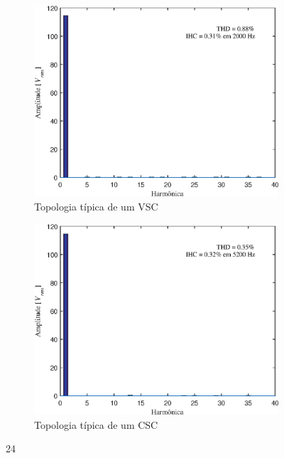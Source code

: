 \begin{figure}[!htb] %
	\centering
	\begin{subfigure}[b]{0.48\textwidth}
		\centering
		\includegraphics[width=\textwidth]{Cap4/Figuras/resultados_unfilt_24.eps}
		\caption{Topologia típica de um VSC} 
		\label{fig:resultados_unfilt_24.eps}
	\end{subfigure}%
		\hfill
	\begin{subfigure}[b]{0.48\textwidth}  
		\centering 
		\includegraphics[width=\textwidth]{Cap4/Figuras/resultados_filt_24.eps}
		\caption{Topologia típica de um CSC}    
		\label{fig:resultados_filt_24.eps}
	\end{subfigure}%
	\caption{24}
	\label{fig:24}
\end{figure}

\FloatBarrier
